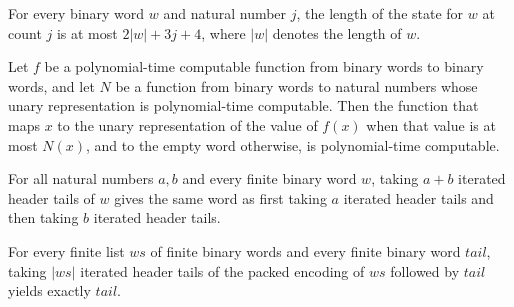 \begin{lemma}
\label{Complexity.clA5Decode_size}
\leanok
{}
For every binary word $w$ and natural number $j$, the length of the state for $w$ at
count $j$ is at most $2|w|+3j+4$, where $|w|$ denotes the length of $w$.
\end{lemma}

\begin{lemma}
\label{Complexity.clA5Decode_native}
\leanok
{}
Let $f$ be a polynomial-time computable function from binary words to binary words, and
let $N$ be a function from binary words to natural numbers whose unary representation is
polynomial-time computable. Then the function that maps $x$ to the unary representation
of the value of $f(x)$ when that value is at most $N(x)$, and to the empty word
otherwise, is polynomial-time computable.
\end{lemma}

\begin{lemma}
\label{Complexity.clA5Tail_add}
\leanok
{}
For all natural numbers $a,b$ and every finite binary word $w$, taking $a+b$ iterated
header tails of $w$ gives the same word as first taking $a$ iterated header tails and
then taking $b$ iterated header tails.
\end{lemma}

\begin{lemma}
\label{Complexity.clA5Tail_fields}
\leanok
{}
For every finite list $ws$ of finite binary words and every finite binary word $tail$,
taking $|ws|$ iterated header tails of the packed encoding of $ws$ followed by $tail$
yields exactly $tail$.
\end{lemma}

